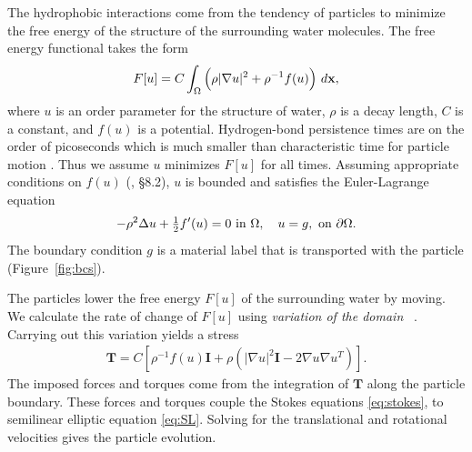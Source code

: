 The hydrophobic interactions come from the tendency of particles to
minimize the free energy of the structure of the surrounding water
molecules. The free energy functional takes the form 
\begin{equation}
\label{eq:free_energy}
  F[u] = C \int_{\Omega} \left(\rho |\nabla u|^2 + \rho^{-1} f(u)\right)
  \,d\mathbf{x},
\end{equation}
where $u$ is an order parameter for the structure of water, $\rho$ is a
decay length, $C$ is a constant, and $f(u)$ is a potential.
Hydrogen-bond persistence times are on the order of picoseconds
which is much smaller than characteristic time for 
particle motion \cite{MaGa13}.
Thus we assume $u$ minimizes $F[u]$ for all times.
Assuming appropriate conditions on $f(u)$ (\cite{evans10}, \S 8.2),
$u$ is bounded and satisfies the Euler-Lagrange equation
\begin{equation}
\label{eq:SL}
-\rho^2 \Delta u + \tfrac{1}{2}f'(u) = 0  \text{ in } \Omega,\quad u = g,
\text{ on } \partial\Omega.
\end{equation}
The boundary condition $g$ is a material label that is transported with
the particle (Figure~\ref{fig:bcs}).

The particles lower the free energy $F[u]$ of the surrounding water
by moving. We calculate the rate of change of $F[u]$ using
\emph{variation of the domain} ~\cite{Fu2018_SIAM,Bandle2015, Schiffer1954, Grinfeld2010}.
Carrying out
this variation yields a 
stress  
\begin{align}
  \label{eq:stress}
\mathbf{T}
= C \left[ \rho^{-1} f(u) \mathbf{I}
  + \rho \left(|\nabla u|^2 \mathbf{I} - 2\nabla u \nabla u^T\right)\right].
\end{align}
The imposed forces and torques come from the integration of $\mathbf{T}$
along the particle boundary.
These forces and torques couple the Stokes equations \eqref{eq:stokes},
to semilinear elliptic equation \eqref{eq:SL}.
Solving for the translational and rotational velocities gives the
particle evolution.



